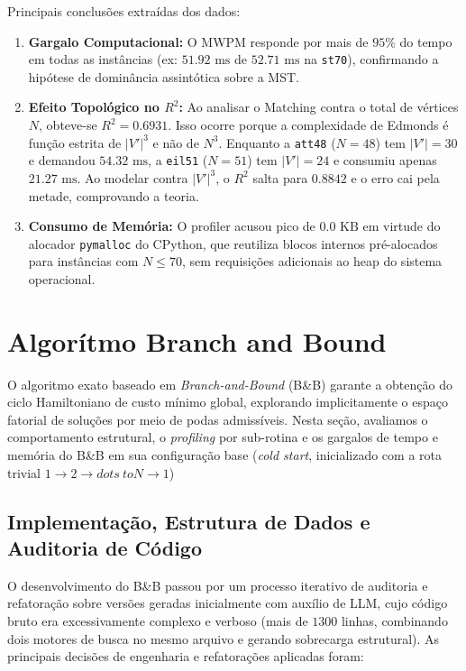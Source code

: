 \documentclass[12pt]{article}
\begin{document}
Principais conclusões extraídas dos dados:
\begin{enumerate}
    \item \textbf{Gargalo Computacional:} O MWPM responde por mais de $95\%$ do tempo em todas as instâncias (ex: $51.92\text{ ms}$ de $52.71\text{ ms}$ na \texttt{st70}), confirmando a hipótese de dominância assintótica sobre a MST.
    \item \textbf{Efeito Topológico no $R^2$:} Ao analisar o Matching contra o total de vértices $N$, obteve-se $R^2 = 0.6931$. Isso ocorre porque a complexidade de Edmonds é função estrita de $|V'|^3$ e não de $N^3$. Enquanto a \texttt{att48} ($N=48$) tem $|V'|=30$ e demandou $54.32\text{ ms}$, a \texttt{eil51} ($N=51$) tem $|V'|=24$ e consumiu apenas $21.27\text{ ms}$. Ao modelar contra $|V'|^3$, o $R^2$ salta para $0.8842$ e o erro cai pela metade, comprovando a teoria.
    \item \textbf{Consumo de Memória:} O profiler acusou pico de $0.0\text{ KB}$ em virtude do alocador \texttt{pymalloc} do CPython, que reutiliza blocos internos pré-alocados para instâncias com $N \le 70$, sem requisições adicionais ao heap do sistema operacional.
\end{enumerate}


\section{Algorítmo Branch and Bound}
\label{sec:bnb}
O algoritmo exato baseado em \textit{Branch-and-Bound} (B\&B) garante a obtenção do ciclo Hamiltoniano de custo mínimo global, explorando implicitamente o espaço fatorial de soluções por meio de podas admissíveis. Nesta seção, avaliamos o comportamento estrutural, o \textit{profiling} por sub-rotina e os gargalos de tempo e memória do B\&B em sua configuração base (\textit{cold start}, inicializado com a rota trivial $1 \to 2 \to dots \ to N \to 1$)

\subsection{Implementação, Estrutura de Dados e Auditoria de Código}
O desenvolvimento do B\&B passou por um processo iterativo de auditoria e refatoração sobre versões geradas inicialmente com auxílio de LLM, cujo código bruto era excessivamente complexo e verboso (mais de $1300$ linhas, combinando dois motores de busca no mesmo arquivo e gerando sobrecarga estrutural). As principais decisões de engenharia e refatorações aplicadas foram:
\end{document}
